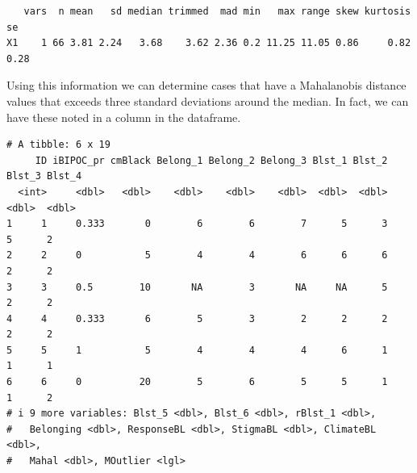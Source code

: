\documentclass[
  11pt,
]{book}
\newenvironment{Shaded}{\begin{snugshade}}{\end{snugshade}}
\newcommand{\CommentTok}[1]{\textcolor[rgb]{0.37,0.37,0.37}{\textit{#1}}}
\newcommand{\ConstantTok}[1]{\textcolor[rgb]{0.37,0.37,0.37}{#1}}
\newcommand{\DecValTok}[1]{\textcolor[rgb]{0.06,0.06,0.06}{#1}}
\newcommand{\FunctionTok}[1]{\textcolor[rgb]{0.27,0.27,0.27}{\textbf{#1}}}
\newcommand{\NormalTok}[1]{#1}
\newcommand{\OtherTok}[1]{\textcolor[rgb]{0.37,0.37,0.37}{#1}}
\newcommand{\SpecialCharTok}[1]{\textcolor[rgb]{0.43,0.43,0.43}{\textbf{#1}}}
\begin{document}
\begin{verbatim}
   vars  n mean   sd median trimmed  mad min   max range skew kurtosis   se
X1    1 66 3.81 2.24   3.68    3.62 2.36 0.2 11.25 11.05 0.86     0.82 0.28
\end{verbatim}

Using this information we can determine cases that have a Mahalanobis distance values that exceeds three standard deviations around the median. In fact, we can have these noted in a column in the dataframe.

\begin{Shaded}
\end{Shaded}

\begin{verbatim}
# A tibble: 6 x 19
     ID iBIPOC_pr cmBlack Belong_1 Belong_2 Belong_3 Blst_1 Blst_2 Blst_3 Blst_4
  <int>     <dbl>   <dbl>    <dbl>    <dbl>    <dbl>  <dbl>  <dbl>  <dbl>  <dbl>
1     1     0.333       0        6        6        7      5      3      5      2
2     2     0           5        4        4        6      6      6      2      2
3     3     0.5        10       NA        3       NA     NA      5      2      2
4     4     0.333       6        5        3        2      2      2      2      2
5     5     1           5        4        4        4      6      1      1      1
6     6     0          20        5        6        5      5      1      1      2
# i 9 more variables: Blst_5 <dbl>, Blst_6 <dbl>, rBlst_1 <dbl>,
#   Belonging <dbl>, ResponseBL <dbl>, StigmaBL <dbl>, ClimateBL <dbl>,
#   Mahal <dbl>, MOutlier <lgl>
\end{verbatim}
\end{document}
